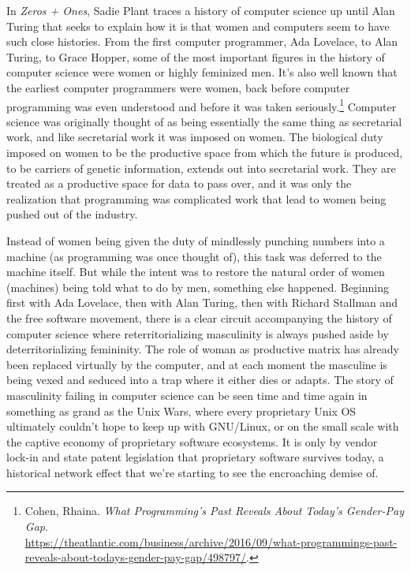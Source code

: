 \documentclass[10pt, statementpaper, twoside, openright]{memoir}
\begin{document}
In \textit{Zeros + Ones}, Sadie Plant traces a history of computer science up until Alan Turing that seeks to explain how it is that women and computers seem to have such close histories. From the first computer programmer, Ada Lovelace, to Alan Turing, to Grace Hopper, some of the most important figures in the history of computer science were women or highly feminized men. It's also well known that the earliest computer programmers were women, back before computer programming was even understood and before it was taken seriously.\footnote{Cohen, Rhaina. \textit{What Programming's Past Reveals About Today's Gender-Pay Gap}.\\ \href{https://www.theatlantic.com/business/archive/2016/09/what-programmings-past-reveals-about-todays-gender-pay-gap/498797/}{https://theatlantic.com/business/archive/2016/09/what-programmings-past-reveals-about-todays-gender-pay-gap/498797/}.} Computer science was originally thought of as being essentially the same thing as secretarial work, and like secretarial work it was imposed on women. The biological duty imposed on women to be the productive space from which the future is produced, to be carriers of genetic information, extends out into secretarial work. They are treated as a productive space for data to pass over, and it was only the realization that programming was complicated work that lead to women being pushed out of the industry.

Instead of women being given the duty of mindlessly punching numbers into a machine (as programming was once thought of), this task was deferred to the machine itself. But while the intent was to restore the natural order of women (machines) being told what to do by men, something else happened. Beginning first with Ada Lovelace, then with Alan Turing, then with Richard Stallman and the free software movement, there is a clear circuit accompanying the history of computer science where reterritorializing masculinity is always pushed aside by deterritorializing femininity. The role of woman as productive matrix has already been replaced virtually by the computer, and at each moment the masculine is being vexed and seduced into a trap where it either dies or adapts. The story of masculinity failing in computer science can be seen time and time again in something as grand as the Unix Wars, where every proprietary Unix OS ultimately couldn't hope to keep up with GNU/Linux, or on the small scale with the captive economy of proprietary software ecosystems. It is only by vendor lock-in and state patent legislation that proprietary software survives today, a historical network effect that we're starting to see the encroaching demise of.
\end{document}
